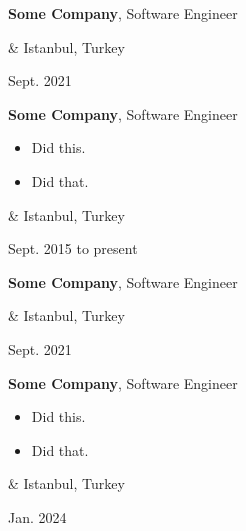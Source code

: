\documentclass[10pt, letterpaper]{article}
\newenvironment{highlights}{
        \begin{itemize}[
                topsep=0pt,
                parsep=0.10 cm,
                partopsep=0pt,
                itemsep=0pt,
                after=\vspace{-1\baselineskip},
                leftmargin=0.4 cm + 3pt
            ]
    }{
        \end{itemize}
    } %
\let\originalTabularx\tabularx
\let\originalEndTabularx\endtabularx
\renewenvironment{tabularx}{\bgroup\centering\originalTabularx}{\originalEndTabularx\par\egroup}
\begin{document}
        \vspace{0.2 cm}
        \begin{tabularx}{
            \textwidth-0.4 cm-0.13cm
        }{
            K{0.2 cm}
            R{4.1 cm}
        }
            \textbf{Some Company}, Software Engineer

            \vspace{0.10 cm}

            &
            Istanbul, Turkey

            Sept. 2021
        \end{tabularx}

        \vspace{0.2 cm}
        \begin{tabularx}{
            \textwidth-0.4 cm-0.13cm
        }{
            K{0.2 cm}
            R{4.1 cm}
        }
            \textbf{Some Company}, Software Engineer

            \vspace{0.10 cm}

            \begin{highlights}
                \item Did this.
                \item Did that.
            \end{highlights}
            &
            Istanbul, Turkey

            Sept. 2015 to present
        \end{tabularx}

        \vspace{0.2 cm}
        \begin{tabularx}{
            \textwidth-0.4 cm-0.13cm
        }{
            K{0.2 cm}
            R{4.1 cm}
        }
            \textbf{Some Company}, Software Engineer

            \vspace{0.10 cm}

            &
            Istanbul, Turkey

            Sept. 2021
        \end{tabularx}

        \vspace{0.2 cm}
        \begin{tabularx}{
            \textwidth-0.4 cm-0.13cm
        }{
            K{0.2 cm}
            R{4.1 cm}
        }
            \textbf{Some Company}, Software Engineer

            \vspace{0.10 cm}

            \begin{highlights}
                \item Did this.
                \item Did that.
            \end{highlights}
            &
            Istanbul, Turkey

            Jan. 2024
        \end{tabularx}
\end{document}
